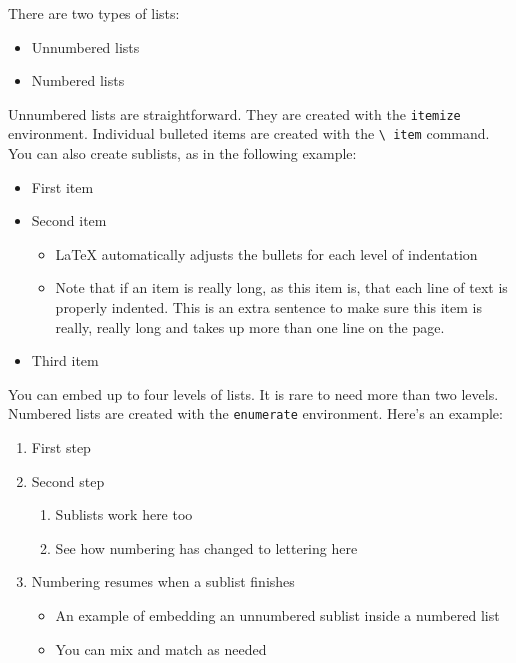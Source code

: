 \documentclass{article}
\begin{document}
There are two types of lists:
\begin{itemize}
  \item Unnumbered lists
  \item Numbered lists
\end{itemize}

Unnumbered lists are straightforward. They are created with the {\tt itemize}
environment. Individual bulleted items are created with the {\tt \textbackslash
item} command.\\

You can also create sublists, as in the following example:
\begin{itemize}
  \item First item
  \item Second item
  \begin{itemize}
    \item \LaTeX{} automatically adjusts the bullets for each level of
    indentation
    \item Note that if an item is really long, as this item is, that each line
    of text is properly indented. This is an extra sentence to make sure this
    item is really, really long and takes up more than one line on the page.
  \end{itemize}
  \item Third item
\end{itemize}

You can embed up to four levels of lists. It is rare to need more than two
levels.\\

Numbered lists are created with the {\tt enumerate} environment. Here's an
example:
\begin{enumerate}
  \item First step
  \item Second step
  \begin{enumerate}
    \item Sublists work here too
    \item See how numbering has changed to lettering here
  \end{enumerate}
  \item Numbering resumes when a sublist finishes
  \begin{itemize}
    \item An example of embedding an unnumbered sublist inside a numbered list
    \item You can mix and match as needed
  \end{itemize}
\end{enumerate}
\end{document}
